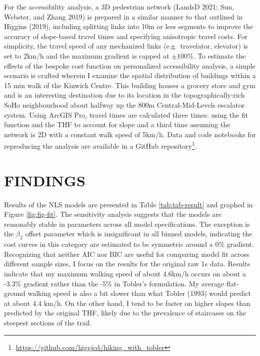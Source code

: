\documentclass{article}
\begin{document}
For the accessibility analysis, a 3D pedestrian network (LandsD 2021;
Sun, Webster, and Zhang 2019) is prepared in a similar manner to that
outlined in Higgins (2019), including splitting links into 10m or less
segments to improve the accuracy of slope-based travel times and
specifying anisotropic travel costs. For simplicity, the travel speed of
any mechanized links (e.g.~travelator, elevator) is set to 2km/h and the
maximum gradient is capped at \(\pm{100}\)\%. To estimate the effects of
the bespoke cost function on personalized accessibility analysis, a
simple scenario is crafted wherein I examine the spatial distribution of
buildings within a 15 min walk of the Kinwick Centre. This building
houses a grocery store and gym and is an interesting destination due to
its location in the topographically-rich SoHo neighbourhood about
halfway up the 800m Central-Mid-Levels escalator system. Using ArcGIS
Pro, travel times are calculated three times: using the fit function and
the THF to account for slope and a third time assuming the network is 2D
with a constant walk speed of 5km/h. Data and code notebooks for
reproducing the analysis are available in a GitHub
repository\footnote{\url{https://github.com/higgicd/hiking_with_tobler}}.

\hypertarget{findings}{%
\section{FINDINGS}\label{findings}}

Results of the NLS models are presented in Table \ref{tab:tab-result}
and graphed in Figure \ref{fig:fig-fit}. The sensitivity analysis
suggests that the models are reasonably stable in parameters across all
model specifications. The exception is the \(\beta_2\) offset parameter
which is insignificant in all binned models, indicating the cost curves
in this category are estimated to be symmetric around a 0\% gradient.
Recognizing that neither AIC nor BIC are useful for comparing model fit
across different sample sizes, I focus on the results for the original
raw 1s data. Results indicate that my maximum walking speed of about
4.6km/h occurs on about a -3.3\% gradient rather than the -5\% in
Tobler's formulation. My average flat-ground walking speed is also a bit
slower than what Tobler (1993) would predict at about 4.4 km/h. On the
other hand, I tend to be faster on higher slopes than predicted by the
original THF, likely due to the prevalence of staircases on the steepest
sections of the trail.
\end{document}
